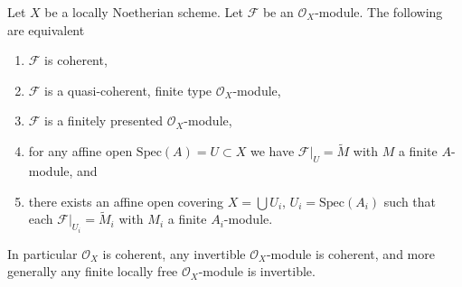 \begin{lemma}
\label{lemma-coherent-Noetherian}
Let $X$ be a locally Noetherian scheme.
Let $\mathcal{F}$ be an $\mathcal{O}_X$-module.
The following are equivalent
\begin{enumerate}
\item $\mathcal{F}$ is coherent,
\item $\mathcal{F}$ is a quasi-coherent, finite type $\mathcal{O}_X$-module,
\item $\mathcal{F}$ is a finitely presented $\mathcal{O}_X$-module,
\item for any affine open $\text{Spec}(A) = U \subset X$ we have
$\mathcal{F}|_U = \widetilde M$ with $M$ a finite $A$-module, and
\item there exists an affine open covering $X = \bigcup U_i$,
$U_i = \text{Spec}(A_i)$ such that each
$\mathcal{F}|_{U_i} = \widetilde M_i$ with $M_i$ a finite $A_i$-module.
\end{enumerate}
In particular $\mathcal{O}_X$ is coherent, any invertible
$\mathcal{O}_X$-module is coherent, and more generally any
finite locally free $\mathcal{O}_X$-module is invertible.
\end{lemma}


